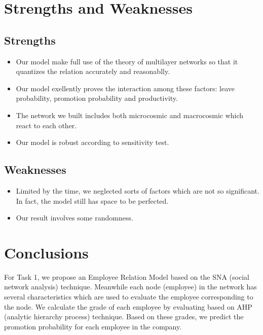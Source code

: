 \documentclass[12pt,a4paper,titlepage]{article}
\begin{document}
\section{Strengths and Weaknesses}
\label{sec:strengths-and-weaknesses}

\subsection*{Strengths}
\label{sec:strengths}

\begin{itemize}
\item Our model make full use of the theory of multilayer networks so
  that it quantizes the relation accurately and reasonablly.
\item Our model exellently proves the interaction among these
  factors: leave probability, promotion probability and productivity.
\item The network we built includes both microcosmic and macrocosmic which react to each other.
\item Our model is robust according to sensitivity test.
\end{itemize}

\subsection*{Weaknesses}
\label{sec:weaknesses}

\begin{itemize}
\item Limited by the time, we neglected sorts of factors which are not
  so significant. In fact, the model still has space to be perfected.
\item Our result involves some randomness.
\end{itemize}

\section{Conclusions}
\label{sec:conclusions}

For Task 1, we propose an Employee Relation Model based on the SNA
(social network analysis) technique. Meanwhile each node (employee) in
the network has several characteristics which are used to evaluate the
employee corresponding to the node. We calculate the grade of each
employee by evaluating based on AHP (analytic hierarchy process)
technique. Based on these grades, we predict the promotion probability
for each employee in the company.
\end{document}

